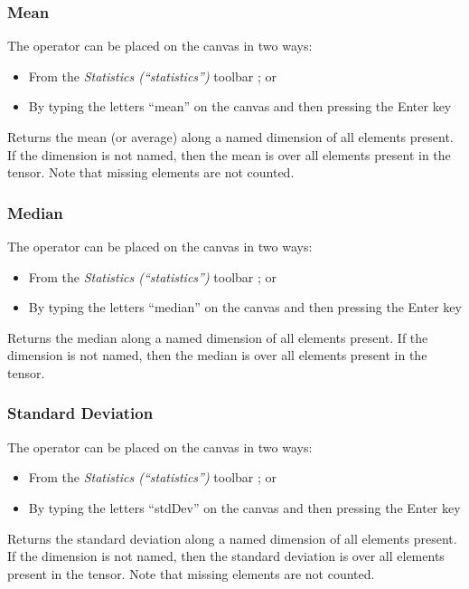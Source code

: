 \subsubsection{Mean}

\label{Operation:mean}


The operator can be placed on the canvas in two ways:
\begin{itemize}
\item From the \emph{Statistics (``statistics'')} toolbar ;
or 
\item By typing the letters ``mean'' on the canvas and then pressing the
Enter key
\end{itemize}
Returns the mean (or average) along a named dimension of all elements
present. If the dimension is not named, then the mean is over all
elements present in the tensor. Note that missing elements are not
counted.

\subsubsection{Median}

\label{Operation:median}

The operator can be placed on the canvas in two ways:
\begin{itemize}
\item From the \emph{Statistics (``statistics'')} toolbar ;
or 
\item By typing the letters ``median'' on the canvas and then pressing the
Enter key
\end{itemize}
Returns the median along a named dimension of all elements present.
If the dimension is not named, then the median is over all elements
present in the tensor.

\subsubsection{Standard Deviation}

\label{Operation:stdDev}


The operator can be placed on the canvas in two ways:
\begin{itemize}
\item From the \emph{Statistics (``statistics'')} toolbar ;
or 
\item By typing the letters ``stdDev'' on the canvas and then pressing the
Enter key
\end{itemize}
Returns the standard deviation along a named dimension of all elements
present. If the dimension is not named, then the standard deviation
is over all elements present in the tensor. Note that missing elements
are not counted.

